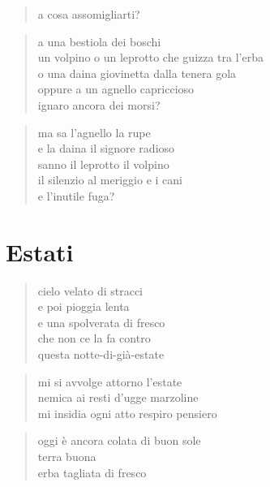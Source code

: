\clearpage


\begin{verse}
    a cosa assomigliarti?
\end{verse}

\begin{verse}
    a una bestiola dei boschi\\
    un volpino o un leprotto che guizza tra l'erba\\
    o una daina giovinetta dalla tenera gola\\
    oppure a un agnello capriccioso\\
    ignaro ancora dei morsi?
\end{verse}

\begin{verse}
    ma sa l'agnello la rupe\\
    e la daina il signore radioso\\
    sanno il leprotto il volpino\\
    il silenzio al meriggio e i cani\\
    e l'inutile fuga?
\end{verse}
\chapter*{Estati}


\begin{verse}
    cielo velato di stracci\\
    e poi pioggia lenta\\
    e una spolverata di fresco\\
    che non ce la fa contro\\
    questa notte-di-già-estate
\end{verse}

\clearpage


\begin{verse}
    mi si avvolge attorno l'estate\\
    nemica ai resti d'ugge marzoline\\
    mi insidia ogni atto respiro pensiero
\end{verse}

\begin{verse}
    oggi è ancora colata di buon sole\\
    terra buona\\
    erba tagliata di fresco
\end{verse}

